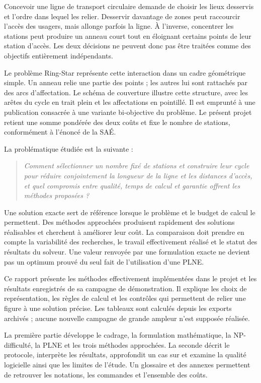 Concevoir une ligne de transport circulaire demande de choisir les lieux desservis
et l'ordre dans lequel les relier. Desservir davantage de zones peut raccourcir
l'accès des usagers, mais allonge parfois la ligne. À l'inverse, concentrer les
stations peut produire un anneau court tout en éloignant certains points de leur
station d'accès. Les deux décisions ne peuvent donc pas être traitées comme des
objectifs entièrement indépendants.

Le problème Ring-Star représente cette interaction dans un cadre géométrique
simple. Un anneau relie une partie des points ; les autres lui sont rattachés par
des arcs d'affectation. Le schéma de couverture illustre cette structure, avec les
arêtes du cycle en trait plein et les affectations en pointillé. Il est emprunté à
une publication consacrée à une variante bi-objective du problème\cite{figure}.
Le présent projet retient une somme pondérée des deux coûts et fixe le nombre
de stations, conformément à l'énoncé de la SAÉ\cite{enonce}.

La problématique étudiée est la suivante :
\begin{quote}\itshape
Comment sélectionner un nombre fixé de stations et construire leur cycle pour
réduire conjointement la longueur de la ligne et les distances d'accès, et quel
compromis entre qualité, temps de calcul et garantie offrent les méthodes proposées ?
\end{quote}

Une solution exacte sert de référence lorsque le problème et le budget de calcul
le permettent. Des méthodes approchées produisent rapidement des solutions
réalisables et cherchent à améliorer leur coût. La comparaison doit prendre en
compte la variabilité des recherches, le travail effectivement réalisé et le
statut des résultats du solveur. Une valeur renvoyée par une formulation exacte
ne devient pas un optimum prouvé du seul fait de l'utilisation d'une PLNE.

Ce rapport présente les méthodes effectivement implémentées dans le projet et
les résultats enregistrés de sa campagne de démonstration. Il explique les choix
de représentation, les règles de calcul et les contrôles qui permettent de relier
une figure à une solution précise. Les tableaux sont calculés depuis les exports
archivés ; aucune nouvelle campagne de grande ampleur n'est supposée réalisée.

La première partie développe le cadrage, la formulation mathématique, la
NP-difficulté, la PLNE et les trois méthodes approchées. La seconde décrit le
protocole, interprète les résultats, approfondit un cas sur  et examine
la qualité logicielle ainsi que les limites de l'étude. Un glossaire et des annexes
permettent de retrouver les notations, les commandes et l'ensemble des coûts.
